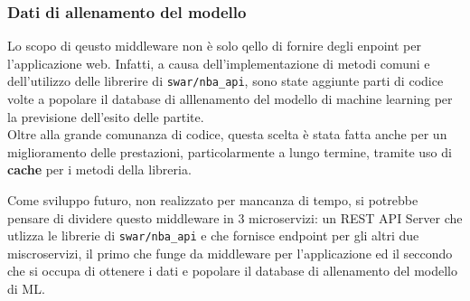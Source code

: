 \subsubsection{Dati di allenamento del modello}
Lo scopo di qeusto middleware non è solo qello di fornire degli enpoint per l'applicazione web. Infatti, a causa dell'implementazione di metodi comuni e dell'utilizzo delle librerire di \texttt{swar/nba\_api}, sono state aggiunte parti di codice volte a popolare il database di alllenamento del modello di machine learning per la previsione dell'esito delle partite. \\

Oltre alla grande comunanza di codice, questa scelta è stata fatta anche per un miglioramento delle prestazioni, particolarmente a lungo termine, tramite uso di \textbf{cache} per i metodi della libreria.

Come sviluppo futuro, non realizzato per mancanza di tempo, si potrebbe pensare di dividere questo middleware in 3 microservizi: un REST API Server che utlizza le librerie di \texttt{swar/nba\_api} e che fornisce endpoint per gli altri due miscroservizi, il primo che funge da middleware per l'applicazione ed il seccondo che si occupa di ottenere i dati e popolare il database di allenamento del modello di ML.

